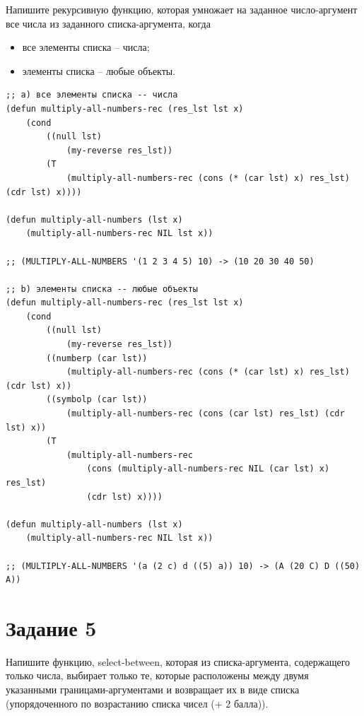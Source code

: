 \documentclass[a4paper,14pt, unknownkeysallowed]{extreport}
\begin{document}
Напишите рекурсивную функцию, которая умножает на заданное число-аргумент все числа из заданного списка-аргумента, когда

\begin{itemize}
	\item все элементы списка -- числа;
	\item элементы списка -- любые объекты.
\end{itemize}

\clearpage

\begin{center}
\captionsetup{justification=raggedright,singlelinecheck=off}
\begin{lstlisting}[label=lst:parallel_processing,caption=Решение задания 4 (a)]
;; a) все элементы списка -- числа
(defun multiply-all-numbers-rec (res_lst lst x)
	(cond
		((null lst)
			(my-reverse res_lst))
		(T 
			(multiply-all-numbers-rec (cons (* (car lst) x) res_lst) (cdr lst) x))))

(defun multiply-all-numbers (lst x)
	(multiply-all-numbers-rec NIL lst x))

;; (MULTIPLY-ALL-NUMBERS '(1 2 3 4 5) 10) -> (10 20 30 40 50)

;; b) элементы списка -- любые объекты
(defun multiply-all-numbers-rec (res_lst lst x)
    (cond
        ((null lst)
            (my-reverse res_lst))
        ((numberp (car lst))
            (multiply-all-numbers-rec (cons (* (car lst) x) res_lst) (cdr lst) x))
        ((symbolp (car lst)) 
            (multiply-all-numbers-rec (cons (car lst) res_lst) (cdr lst) x))
        (T 
            (multiply-all-numbers-rec 
                (cons (multiply-all-numbers-rec NIL (car lst) x) res_lst) 
                (cdr lst) x))))

(defun multiply-all-numbers (lst x)
    (multiply-all-numbers-rec NIL lst x))

;; (MULTIPLY-ALL-NUMBERS '(a (2 c) d ((5) a)) 10) -> (A (20 C) D ((50) A))
\end{lstlisting}
\end{center}

\section{Задание 5}

Напишите функцию, select-between, которая из списка-аргумента, содержащего только числа, выбирает только те, которые расположены между двумя указанными границами-аргументами и возвращает их в виде списка (упорядоченного по возрастанию списка чисел (+ 2 балла)).
\end{document}
